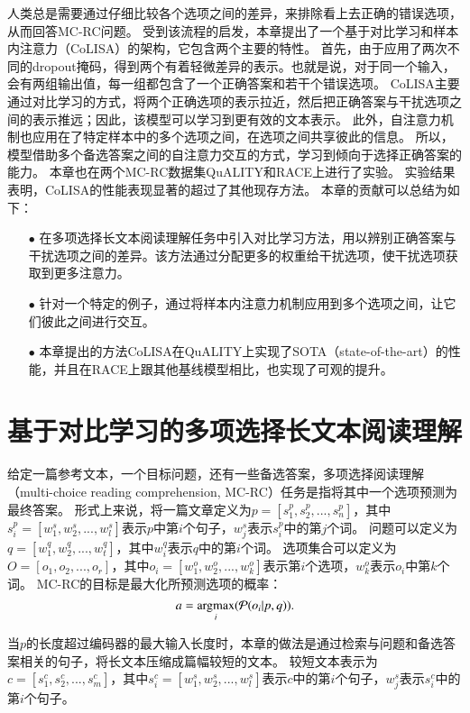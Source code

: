 

人类总是需要通过仔细比较各个选项之间的差异，来排除看上去正确的错误选项，从而回答MC-RC问题\cite{daniel2017thinking}。
受到该流程的启发，本章提出了一个基于对比学习和样本内注意力（CoLISA）的架构，它包含两个主要的特性。
首先，由于应用了两次不同的dropout掩码，得到两个有着轻微差异的表示。也就是说，对于同一个输入，会有两组输出值，每一组都包含了一个正确答案和若干个错误选项。
CoLISA主要通过对比学习的方式，将两个正确选项的表示拉近，然后把正确答案与干扰选项之间的表示推远；因此，该模型可以学习到更有效的文本表示。
此外，自注意力机制\cite{vaswani2017attention}也应用在了特定样本中的多个选项之间，在选项之间共享彼此的信息。
所以，模型借助多个备选答案之间的自注意力交互的方式，学习到倾向于选择正确答案的能力。
本章也在两个MC-RC数据集QuALITY\cite{pang2021quality}和RACE\cite{lai2017race}上进行了实验。
实验结果表明，CoLISA的性能表现显著的超过了其他现存方法。
本章的贡献可以总结为如下：
\begin{itemize}
    \item[$\bullet$] 在多项选择长文本阅读理解任务中引入对比学习方法，用以辨别正确答案与干扰选项之间的差异。该方法通过分配更多的权重给干扰选项，使干扰选项获取到更多注意力。
    \item[$\bullet$] 针对一个特定的例子，通过将样本内注意力机制应用到多个选项之间，让它们彼此之间进行交互。
    \item[$\bullet$] 本章提出的方法CoLISA在QuALITY上实现了SOTA（state-of-the-art）的性能，并且在RACE上跟其他基线模型相比，也实现了可观的提升。
\end{itemize}


\section{基于对比学习的多项选择长文本阅读理解}
给定一篇参考文本，一个目标问题，还有一些备选答案，多项选择阅读理解（multi-choice reading comprehension, MC-RC）任务是指将其中一个选项预测为最终答案。
形式上来说，将一篇文章定义为$p=[s^p_1, s^p_2, ..., s^p_n]$，其中$s^p_i=[w^s_1, w^s_2, ..., w^s_l]$表示$p$中第$i$个句子，$w^s_j$表示$s^p_i$中的第$j$个词。
问题可以定义为$q=[w^q_1, w^q_2, ..., w^q_t]$，其中$w^q_i$表示$q$中的第$i$个词。
选项集合可以定义为$O=[o_1, o_2, ..., o_r]$，其中$o_i=[w^o_1, w^o_2, ..., w^o_k]$表示第$i$个选项，$w^o_k$表示$o_i$中第$k$个词。
MC-RC的目标是最大化所预测选项的概率：
\begin{equation}
    a = \operatorname*{argmax}_i(\mathcal P(o_i|p,q)).
\end{equation}

当$p$的长度超过编码器的最大输入长度时，本章的做法是通过检索与问题和备选答案相关的句子，将长文本压缩成篇幅较短的文本。
较短文本表示为$c=[s^c_1, s^c_2, ..., s^c_m]$，其中$s^c_i=[w^s_1, w^s_2, ..., w^s_l]$表示$c$中的第$i$个句子，$w^s_j$表示$s^c_i$中的第$i$个句子。

